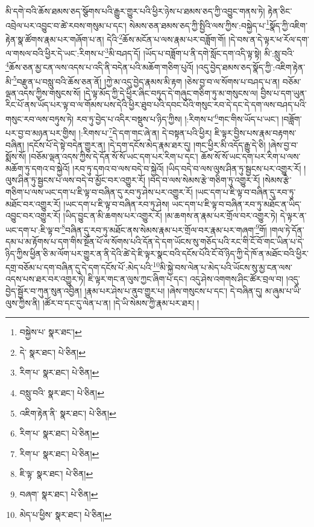 མི་དགེ་བའི་ཆོས་ཐམས་ཅད་སྩོགས་པའི་རྒྱུར་གྱུར་པའི་ཕྱིར་ཉེས་པ་ཐམས་ཅད་ཀྱི་འབྱུང་གནས་ཏེ། རྟེན་ཅིང་འབྲེལ་པར་འབྱུང་བ་ཚེ་རབས་གསུམ་པ་དང་། སེམས་ཅན་ཐམས་ཅད་ཀྱི་སྤྱིའི་ལས་ཀྱིས་:བསྐྱེད་པ་\footnote{བསྐྱེས་པ་  སྣར་ཐང་། }སྣོད་ཀྱི་འཇིག་རྟེན་སྣ་ཚོགས་རྣམ་པར་གཞོག་པ་ན། དེའི་\footnote{དེ་  སྣར་ཐང་།  པེ་ཅིན། }ཆོས་མངོན་པ་ལས་རྣམ་པར་བཟློག་གོ། །དེ་བས་ན་དེ་ལྟར་ཕ་རོལ་དག་ལ་གསལ་བའི་ཕྱིར་དེ་ཡང་:རིགས་པ་\footnote{རིག་པ་  སྣར་ཐང་།  པེ་ཅིན། }མི་བཤད་དོ། །ཡོད་པ་བཟློག་པ་ནི་དགེ་སློང་དག་འདི་ལྟ་སྟེ། མི་:སླུ་བའི་\footnote{བསླུ་བའི་  སྣར་ཐང་།  པེ་ཅིན། }ཆོས་ཅན་མྱ་ངན་ལས་འདས་པ་འདི་ནི་བདེན་པའི་མཆོག་གཅིག་པུའོ། །འདུ་བྱེད་ཐམས་ཅད་སྣོད་ཀྱི་:འཇིག་རྟེན་མི་\footnote{འཇིག་རྟེན་ནི་  སྣར་ཐང་།  པེ་ཅིན། }བརྫུན་པ་བསླུ་བའི་ཆོས་ཅན་ནོ། །ཀྱེ་མ་འདུ་བྱེད་རྣམས་མི་རྟག །ཅེས་བྱ་བ་ལ་སོགས་པ་བཤད་པ་ན། བཅོམ་ལྡན་འདས་ཀྱིས་གསུངས་སོ། །དེ་ལྟ་མོད་ཀྱི་དེ་ཕྱིར་ཞིང་བཏུད་དེ་གཞུང་གཅིག་ཏུ་མ་གསུངས་ལ། བྱིས་པ་དག་ཡུན་རིང་པོ་ནས་ཡོད་པར་ལྟ་བ་ལ་གོམས་པས་དེའི་ཕྱིར་ཐུབ་པའི་དབང་པོའི་གསུང་རབ་དེ་དང་དེ་དག་ལས་བཤད་པའི་གསུང་རབ་ལས་བཏུས་ཏེ། རབ་ཏུ་བྱེད་པ་འདིར་བསྡུས་པ་ཉིད་ཀྱིས། །:རིགས་པ་\footnote{རིག་པ་  སྣར་ཐང་།  པེ་ཅིན། }གང་གིས་ཡོད་པ་ཡང་། །བཟློག་པར་བྱ་བ་མཉན་པར་གྱིས། །:རིགས་པ་\footnote{རིག་པ་  སྣར་ཐང་།  པེ་ཅིན། }དེ་དག་གང་ཞེ་ན། དེ་བསྟན་པའི་ཕྱིར། ཇི་ལྟར་བྱིས་པས་རྣམ་བརྟགས་བཞིན། །དངོས་པོ་དེ་སྟེ་བདེན་གྱུར་ན། །དེ་དག་དངོས་མེད་རྣམ་ཐར་དུ། །གང་ཕྱིར་མི་འདོད་རྒྱུ་དེ་ཅི། །ཞེས་བྱ་བ་སྨོས་སོ། །བཅོམ་ལྡན་འདས་ཀྱིས་དེ་དོན་སོ་སོ་ཡང་དག་པར་རིག་པ་དང་། ཆོས་སོ་སོ་ཡང་དག་པར་རིག་པ་ལས་མཆོག་ཏུ་དགའ་བ་སྐྱེའོ། །རབ་ཏུ་དགའ་བ་ལས་བདེ་བ་སྐྱེའོ། །ཡིད་བདེ་བ་ལས་ལུས་ཤིན་ཏུ་སྦྱངས་པར་འགྱུར་རོ། །ལུས་ཤིན་ཏུ་སྦྱངས་པ་ལས་བདེ་བ་མྱོང་བར་འགྱུར་རོ། །བདེ་བ་ལས་སེམས་རྩེ་གཅིག་ཏུ་འགྱུར་རོ། །སེམས་རྩེ་གཅིག་པ་ལས་ཡང་དག་པ་ཇི་ལྟ་བ་བཞིན་དུ་རབ་ཏུ་ཤེས་པར་འགྱུར་རོ། །ཡང་དག་པ་ཇི་ལྟ་བ་བཞིན་དུ་རབ་ཏུ་མཐོང་བར་འགྱུར་རོ། །ཡང་དག་པ་ཇི་ལྟ་བ་བཞིན་རབ་ཏུ་ཤེས། ཡང་དག་པ་ཇི་ལྟ་བ་བཞིན་རབ་ཏུ་མཐོང་ན་ཡིད་འབྱུང་བར་འགྱུར་རོ། །ཡིད་བྱུང་ན་མི་ཆགས་པར་འགྱུར་རོ། །མ་ཆགས་ན་རྣམ་པར་གྲོལ་བར་འགྱུར་ཏེ། དེ་ལྟར་ན་ཡང་དག་པ་:ཇི་ལྟ་བ་\footnote{ཇི་ལྟ་  སྣར་ཐང་།  པེ་ཅིན། }བཞིན་དུ་རབ་ཏུ་མཐོང་ནས་སེམས་རྣམ་པར་གྲོལ་བར་རྣམ་པར་གཞག་\footnote{བཞག་  སྣར་ཐང་།  པེ་ཅིན། }གོ། །གལ་ཏེ་དོན་དམ་པ་མ་རྟོགས་པ་དག་གིས་སྔོན་པོ་ལ་སོགས་པའི་དོན་དེ་དག་ཡོངས་སུ་གཅོད་པའི་རང་གི་ངོ་བོ་གང་ཡིན་པ་དེ་ཉིད་ཀྱིས་ཕྱིན་ཅི་མ་ལོག་པར་གྱུར་ན་ནི་དེའི་ཚེ་དེ་ཇི་ལྟར་སྣང་བའི་དངོས་པོའི་ངོ་བོ་ཉིད་ཀྱི་དེ་ཁོ་ན་མཐོང་བའི་ཕྱིར་དགྲ་བཅོམ་པ་དག་བཞིན་དུ་དེ་དག་དངོས་པོ་:མེད་པའི་\footnote{མེད་པ་ཕྱིས་  སྣར་ཐང་།  པེ་ཅིན། }མི་སྐྱེ་བས་ལེན་པ་མེད་པའི་ཡོངས་སུ་མྱ་ངན་ལས་འདས་པས་ཐར་བར་འགྱུར་ཏེ། ཇི་ལྟར་གང་ན་ལུས་ཀྱང་ཞིག་པ་དང་། འདུ་ཤེས་འགགས་ཤིང་ཚོར་བྲལ་བ། །འདུ་བྱེད་སྦྱོར་བ་ཀུན་སུན་འབྱིན། །རྣམ་པར་ཤེས་པ་ནུབ་གྱུར་པ། །ཞེས་གསུངས་པ་དང་། དེ་བཞིན་དུ། མ་ཞུམ་པ་ཡི་ལུས་ཀྱིས་ནི། །ཚོར་བ་དང་དུ་ལེན་པ་ན། །དེ་ཡི་སེམས་ཀྱི་རྣམ་པར་ཐར། །
